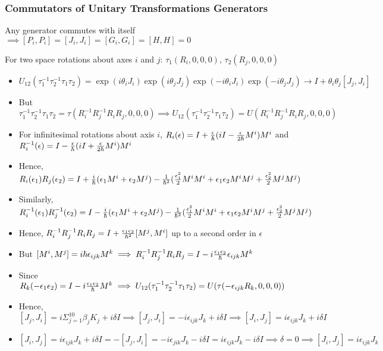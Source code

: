 \documentclass[8pt,t,mathserif,aspectratio=169]{beamer}
\begin{document}
\begin{frame}
  \frametitle{Commutators of Unitary Transformations Generators}
  \vspace{1mm}
  Any generator commutes with itself $\implies [P_i,P_i] = [J_i,J_i] = [G_i,G_i] = [H,H] = 0$

  For two space rotations about axes $i$ and $j$: $\tau_1(R_i,0,0,0)$, $\tau_2(R_j,0,0,0)$
  \begin{itemize}
    \item $U_{12}(\tau^{-1}_1 \tau^{-1}_2 \tau_1 \tau_2) = \exp(i \theta_i J_i) \exp(i \theta_j J_j) \exp(-i \theta_i J_i) \exp(-i \theta_j J_j) \to I + \theta_i \theta_j [J_j,J_i]$
    \item But $\tau^{-1}_1 \tau^{-1}_2 \tau_1 \tau_2 = \tau(R^{-1}_i R^{-1}_j R_i R_j,0,0,0) \implies U_{12}(\tau^{-1}_1 \tau^{-1}_2 \tau_1 \tau_2) = U(R^{-1}_i R^{-1}_j R_i R_j,0,0,0)$
    \item For infinitesimal rotations about axis $i$, $R_i(\epsilon) = I + {\epsilon \over \hbar} (i I - {\epsilon \over 2 \hbar} M^i) M^{i}$ and $R^{-1}_{i}(\epsilon) = I - {\epsilon \over \hbar} (i I + {\epsilon \over 2 \hbar} M^i) M^{i}$
    \item Hence, $R_i(\epsilon_1) R_j(\epsilon_2) = I + {i \over \hbar} (\epsilon_1 M^{i} + \epsilon_2 M^{j}) - {1 \over \hbar^2}({\epsilon^2_1 \over 2} M^i M^i + \epsilon_1 \epsilon_2 M^i M^j + {\epsilon^2_2 \over 2} M^j M^j)$
    \item Similarly, $R^{-1}_{i}(\epsilon_1) R^{-1}_{j}(\epsilon_2) = I - {i \over \hbar} (\epsilon_1 M^{i} + \epsilon_2 M^{j}) - {1 \over \hbar^2}({\epsilon^2_1 \over 2} M^i M^i + \epsilon_1 \epsilon_2 M^i M^j + {\epsilon^2_2 \over 2} M^j M^j)$
    \item Hence, $R^{-1}_{i} R^{-1}_{j} R_i R_j = I + {\epsilon_1 \epsilon_2 \over \hbar^2} [M^j,M^i]$ up to a second order in $\epsilon$
    \item But $[M^i,M^j] = i \hbar \epsilon_{ijk} M^k \implies R^{-1}_{i} R^{-1}_{j} R_i R_j = I - i {\epsilon_1 \epsilon_2 \over \hbar} \epsilon_{ijk} M^k$
    \item Since $R_{k}(-\epsilon_1 \epsilon_2) = I - i {\epsilon_1 \epsilon_2 \over \hbar} M^k \implies U_{12}(\tau^{-1}_1 \tau^{-1}_2 \tau_1 \tau_2) = U(\tau(-\epsilon_{ijk} R_k,0,0,0))$
    \item Hence, $[J_j,J_i] = i \Sigma_{j = 1}^{10} \beta_j K_j + i \delta I \implies [J_j,J_i] = -i \epsilon_{ijk} J_k + i \delta I \implies [J_i,J_j] = i \epsilon_{ijk} J_k + i \delta I$
    \item $[J_i,J_j] = i \epsilon_{ijk} J_k + i \delta I = -[J_j,J_i] = -i \epsilon_{jik} J_k - i \delta I = i \epsilon_{ijk} J_k - i \delta I \implies \delta = 0 \implies [J_i,J_j] = i \epsilon_{ijk} J_k$
  \end{itemize}
\end{frame}
\end{document}
